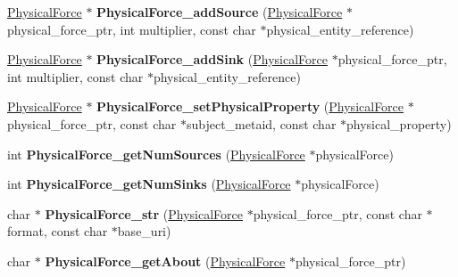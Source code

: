 \begin{DoxyCompactItemize}
\hyperlink{classomexmeta_1_1PhysicalForce}{Physical\+Force} $\ast$ {\bfseries Physical\+Force\+\_\+add\+Source} (\hyperlink{classomexmeta_1_1PhysicalForce}{Physical\+Force} $\ast$physical\+\_\+force\+\_\+ptr, int multiplier, const char $\ast$physical\+\_\+entity\+\_\+reference)
\item 
\mbox{\label{namespaceomexmeta_a75abc8bc74d8bacefd65935f49210343}} 
\hyperlink{classomexmeta_1_1PhysicalForce}{Physical\+Force} $\ast$ {\bfseries Physical\+Force\+\_\+add\+Sink} (\hyperlink{classomexmeta_1_1PhysicalForce}{Physical\+Force} $\ast$physical\+\_\+force\+\_\+ptr, int multiplier, const char $\ast$physical\+\_\+entity\+\_\+reference)
\item 
\mbox{\label{namespaceomexmeta_a3942ac5b5d7393eea5f0644c2f31cbc5}} 
\hyperlink{classomexmeta_1_1PhysicalForce}{Physical\+Force} $\ast$ {\bfseries Physical\+Force\+\_\+set\+Physical\+Property} (\hyperlink{classomexmeta_1_1PhysicalForce}{Physical\+Force} $\ast$physical\+\_\+force\+\_\+ptr, const char $\ast$subject\+\_\+metaid, const char $\ast$physical\+\_\+property)
\item 
\mbox{\label{namespaceomexmeta_aae66100eb98adbc738a6476dcb018e8f}} 
int {\bfseries Physical\+Force\+\_\+get\+Num\+Sources} (\hyperlink{classomexmeta_1_1PhysicalForce}{Physical\+Force} $\ast$physical\+Force)
\item 
\mbox{\label{namespaceomexmeta_a1bec2b6579c0eba8a719f68d39b09c2e}} 
int {\bfseries Physical\+Force\+\_\+get\+Num\+Sinks} (\hyperlink{classomexmeta_1_1PhysicalForce}{Physical\+Force} $\ast$physical\+Force)
\item 
\mbox{\label{namespaceomexmeta_a8a3f3cf23e3c5253f0a92f6374a2059b}} 
char $\ast$ {\bfseries Physical\+Force\+\_\+str} (\hyperlink{classomexmeta_1_1PhysicalForce}{Physical\+Force} $\ast$physical\+\_\+force\+\_\+ptr, const char $\ast$format, const char $\ast$base\+\_\+uri)
\item 
\mbox{\label{namespaceomexmeta_a4428467ced5ab11c48a3b16284048a36}} 
char $\ast$ {\bfseries Physical\+Force\+\_\+get\+About} (\hyperlink{classomexmeta_1_1PhysicalForce}{Physical\+Force} $\ast$physical\+\_\+force\+\_\+ptr)
\item 

\end{DoxyCompactItemize}
